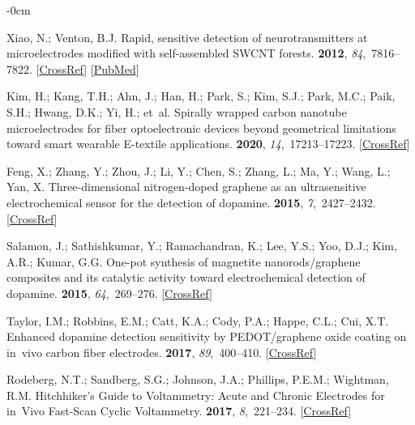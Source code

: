 \documentclass[molecules,article,accept,pdftex,moreauthors]{Definitions/mdpi}
\begin{document}
\begin{adjustwidth}{-\extralength}{0cm}
\begin{thebibliography}{999}
Xiao, N.; Venton, B.J.
\newblock Rapid, sensitive detection of neurotransmitters at microelectrodes
modified with self-assembled SWCNT forests.
 {\bf 2012}, {\em 84},~7816--7822. [\href{http://dx.doi.org/10.1021/ac301445w}{CrossRef}] [\href{http://www.ncbi.nlm.nih.gov/pubmed/22823497}{PubMed}]

Kim, H.; Kang, T.H.; Ahn, J.; Han, H.; Park, S.; Kim, S.J.; Park, M.C.; Paik,
S.H.; Hwang, D.K.; Yi, H.;  et~al.
\newblock Spirally wrapped carbon nanotube microelectrodes for fiber
optoelectronic devices beyond geometrical limitations toward smart wearable
E-textile applications.
 {\bf 2020}, {\em 14},~17213--17223. [\href{http://dx.doi.org/10.1021/acsnano.0c07143}{CrossRef}]

Feng, X.; Zhang, Y.; Zhou, J.; Li, Y.; Chen, S.; Zhang, L.; Ma, Y.; Wang, L.;
Yan, X.
\newblock Three-dimensional nitrogen-doped graphene as an ultrasensitive
electrochemical sensor for the detection of dopamine.
 {\bf 2015}, {\em 7},~2427--2432. [\href{http://dx.doi.org/10.1039/C4NR06623E}{CrossRef}]

Salamon, J.; Sathishkumar, Y.; Ramachandran, K.; Lee, Y.S.; Yoo, D.J.; Kim,
A.R.; Kumar, G.G.
\newblock One-pot synthesis of magnetite nanorods/graphene composites and its
catalytic activity toward electrochemical detection of dopamine.
 {\bf 2015}, {\em 64},~269--276. [\href{http://dx.doi.org/10.1016/j.bios.2014.08.085}{CrossRef}]

Taylor, I.M.; Robbins, E.M.; Catt, K.A.; Cody, P.A.; Happe, C.L.; Cui, X.T.
\newblock Enhanced dopamine detection sensitivity by PEDOT/graphene oxide
coating on in~vivo carbon fiber electrodes.
 {\bf 2017}, {\em 89},~400--410. [\href{http://dx.doi.org/10.1016/j.bios.2016.05.084}{CrossRef}]

Rodeberg, N.T.; Sandberg, S.G.; Johnson, J.A.; Phillips, P.E.M.; Wightman, R.M.
\newblock Hitchhiker's Guide to Voltammetry: Acute and Chronic Electrodes for
in~Vivo Fast-Scan Cyclic Voltammetry.
 {\bf 2017}, {\em 8},~221--234. [\href{http://dx.doi.org/10.1021/acschemneuro.6b00393}{CrossRef}]


\end{thebibliography}
\end{adjustwidth}
\end{document}
